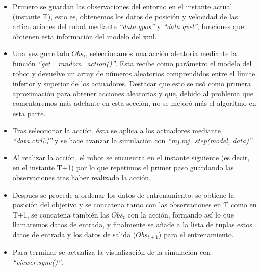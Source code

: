  
\begin{itemize}
  \item Primero se guardan las observaciones del entorno en el instante actual (instante T), esto es, obtenemos los datos de posición y velocidad de las articulaciones del robot mediante 
        \textit{“data.qpos”} y \textit{“data.qvel”}, funciones que obtienen esta información del modelo del \Gls{xml}.

  \item Una vez guardado \( Obs_t \), seleccionamos una acción aleatoria mediante la función \textit{“get \_random\_action()”}. Esta recibe como parámetro el modelo del robot y devuelve un array de números aleatorios 
        comprendidos entre el límite inferior y superior de los actuadores. Destacar que esto se usó como primera aproximación para obtener acciones aleatorias y que, debido al problema que 
        comentaremos más adelante en esta sección, no se mejoró más el algoritmo en esta parte.

  \item Tras seleccionar la acción, ésta se aplica a los actuadores mediante \textit{“data.ctrl[:]”} y se hace avanzar la simulación con \textit{“mj.mj\_step(model, data)”}.

  \item Al realizar la acción, el robot se encuentra en el instante siguiente (es decir, en el instante T+1) por lo que repetimos el primer paso guardando las observaciones tras haber realizado 
        la acción.
  \item Después se procede a ordenar los datos de entrenamiento: se obtiene la posición del objetivo y se concatena tanto con las observaciones en T como en T+1, se concatena también las \( Obs_t \) con 
        la acción, formando así lo que llamaremos datos de entrada, y finalmente se añade a la lista de tuplas estos datos de entrada y los datos de salida (\( Obs_{t+1} \)) para el entrenamiento.
  \item Para terminar se actualiza la visualización de la simulación con \textit{“viewer.sync()”}.

\end{itemize}

